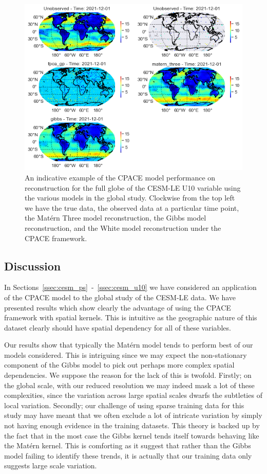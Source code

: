 \begin{figure}
\centering
\includegraphics[width=\textwidth]{full_ex_u10_globe}
\caption{An indicative example of the CPACE model performance on reconstruction for the full globe of the CESM-LE U10 variable using the various models in the global study. Clockwise from the top left we have the true data, the observed data at a particular time point, the Mat\'ern Three model reconstruction, the Gibbs model reconstruction, and the White model reconstruction under the CPACE framework.}
\label{fig:full_ex_u10_globe}
\end{figure}

\subsection{Discussion \label{ssec:globe_discussion}}
In Sections~\ref{ssec:cesm_ps}~-~\ref{ssec:cesm_u10} we have considered an application of the CPACE model to the global study of the CESM-LE data. 
We have presented results which show clearly the advantage of using the CPACE framework with spatial kernels.
This is intuitive as the geographic nature of this dataset clearly should have spatial dependency for all of these variables.

Our results show that typically the Mat\'ern model tends to perform best of our models considered.
This is intriguing since we may expect the non-stationary component of the Gibbs model to pick out perhaps more complex spatial dependencies.
We suppose the reason for the lack of this is twofold.
Firstly; on the global scale, with our reduced resolution we may indeed mask a lot of these complexities, since the variation across large spatial scales dwarfs the subtleties of local variation.
Secondly; our challenge of using sparse training data for this study may have meant that we often exclude a lot of intricate variation by simply not having enough evidence in the training datasets. 
This theory is backed up by the fact that in the most case the Gibbs kernel tends itself towards behaving like the Mat\'ern kernel.
This is comforting as it suggest that rather than the Gibbs model failing to identify these trends, it is actually that our training data only suggests large scale variation.

